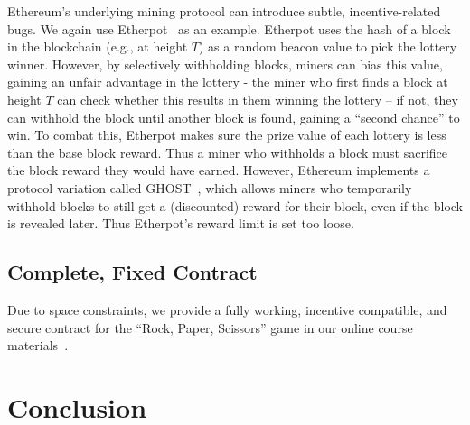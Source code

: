 \documentclass{llncs}
\renewcommand{\paragraph}[1]{\vspace{5pt} \noindent{\bf #1}}
\begin{document}
\paragraph{Incentive bugs.}
Ethereum's underlying mining protocol
can introduce subtle, incentive-related bugs. 
We again use
Etherpot~\cite{etherpot} as an example.
Etherpot uses the hash of a block in the blockchain (e.g., at height $T$) as a random beacon
value to pick the lottery winner. However, by selectively withholding
blocks, miners can bias this value, gaining an unfair advantage
in the lottery - the miner who first finds a block at height $T$ can
check whether this results in them winning the lottery -- if not, they
can withhold the block until another block is found, gaining a
``second chance'' to win.
   To combat this, Etherpot makes sure the prize value of each lottery
is less than the base block reward. Thus a miner who withholds a block must
sacrifice the block reward they would have earned.
   However, Ethereum implements a protocol variation called GHOST~\cite{ghost00,ghost01},
which allows miners who temporarily withhold blocks to still get a
(discounted) reward for their block, even if the block is revealed
later. Thus Etherpot's reward limit is set too loose.


\subsection{Complete, Fixed Contract} 
\vspace{-5pt}
Due to space constraints, 
we provide a fully working, incentive compatible, and secure 
contract for  the ``Rock, Paper, Scissors'' game
in our online course materials~\cite{anonymousethlab}. 



\section{Conclusion}
\vspace{-5pt}
\end{document}
